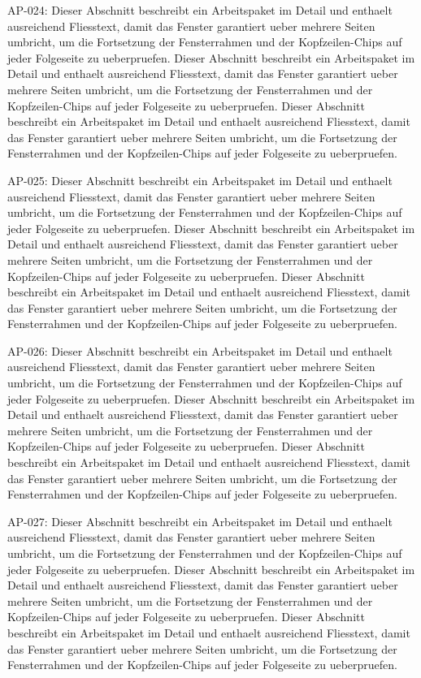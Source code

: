 \documentclass[type=report,theme=dark,language=de]{semio}
\begin{document}
\begin{Table}[title=Lange Tabelle]
AP-024: Dieser Abschnitt beschreibt ein Arbeitspaket im Detail und enthaelt ausreichend Fliesstext, damit das Fenster garantiert ueber mehrere Seiten umbricht, um die Fortsetzung der Fensterrahmen und der Kopfzeilen-Chips auf jeder Folgeseite zu ueberpruefen. Dieser Abschnitt beschreibt ein Arbeitspaket im Detail und enthaelt ausreichend Fliesstext, damit das Fenster garantiert ueber mehrere Seiten umbricht, um die Fortsetzung der Fensterrahmen und der Kopfzeilen-Chips auf jeder Folgeseite zu ueberpruefen. Dieser Abschnitt beschreibt ein Arbeitspaket im Detail und enthaelt ausreichend Fliesstext, damit das Fenster garantiert ueber mehrere Seiten umbricht, um die Fortsetzung der Fensterrahmen und der Kopfzeilen-Chips auf jeder Folgeseite zu ueberpruefen. 

AP-025: Dieser Abschnitt beschreibt ein Arbeitspaket im Detail und enthaelt ausreichend Fliesstext, damit das Fenster garantiert ueber mehrere Seiten umbricht, um die Fortsetzung der Fensterrahmen und der Kopfzeilen-Chips auf jeder Folgeseite zu ueberpruefen. Dieser Abschnitt beschreibt ein Arbeitspaket im Detail und enthaelt ausreichend Fliesstext, damit das Fenster garantiert ueber mehrere Seiten umbricht, um die Fortsetzung der Fensterrahmen und der Kopfzeilen-Chips auf jeder Folgeseite zu ueberpruefen. Dieser Abschnitt beschreibt ein Arbeitspaket im Detail und enthaelt ausreichend Fliesstext, damit das Fenster garantiert ueber mehrere Seiten umbricht, um die Fortsetzung der Fensterrahmen und der Kopfzeilen-Chips auf jeder Folgeseite zu ueberpruefen. 

AP-026: Dieser Abschnitt beschreibt ein Arbeitspaket im Detail und enthaelt ausreichend Fliesstext, damit das Fenster garantiert ueber mehrere Seiten umbricht, um die Fortsetzung der Fensterrahmen und der Kopfzeilen-Chips auf jeder Folgeseite zu ueberpruefen. Dieser Abschnitt beschreibt ein Arbeitspaket im Detail und enthaelt ausreichend Fliesstext, damit das Fenster garantiert ueber mehrere Seiten umbricht, um die Fortsetzung der Fensterrahmen und der Kopfzeilen-Chips auf jeder Folgeseite zu ueberpruefen. Dieser Abschnitt beschreibt ein Arbeitspaket im Detail und enthaelt ausreichend Fliesstext, damit das Fenster garantiert ueber mehrere Seiten umbricht, um die Fortsetzung der Fensterrahmen und der Kopfzeilen-Chips auf jeder Folgeseite zu ueberpruefen. 

AP-027: Dieser Abschnitt beschreibt ein Arbeitspaket im Detail und enthaelt ausreichend Fliesstext, damit das Fenster garantiert ueber mehrere Seiten umbricht, um die Fortsetzung der Fensterrahmen und der Kopfzeilen-Chips auf jeder Folgeseite zu ueberpruefen. Dieser Abschnitt beschreibt ein Arbeitspaket im Detail und enthaelt ausreichend Fliesstext, damit das Fenster garantiert ueber mehrere Seiten umbricht, um die Fortsetzung der Fensterrahmen und der Kopfzeilen-Chips auf jeder Folgeseite zu ueberpruefen. Dieser Abschnitt beschreibt ein Arbeitspaket im Detail und enthaelt ausreichend Fliesstext, damit das Fenster garantiert ueber mehrere Seiten umbricht, um die Fortsetzung der Fensterrahmen und der Kopfzeilen-Chips auf jeder Folgeseite zu ueberpruefen. 


\end{Table}
\end{document}
